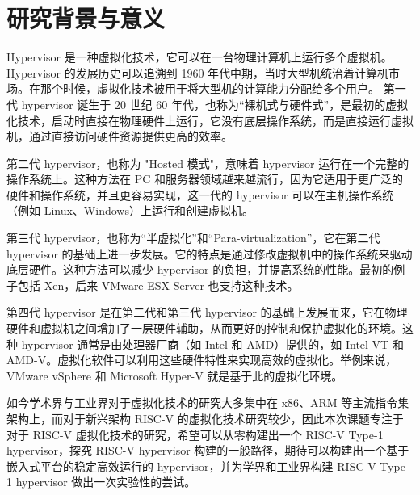 \section{研究背景与意义}
Hypervisor 是一种虚拟化技术，它可以在一台物理计算机上运行多个虚拟机。Hypervisor 的发展历史可以追溯到 1960 年代中期，当时大型机统治着计算机市场。在那个时候，虚拟化技术被用于将大型机的计算能力分配给多个用户。
第一代 hypervisor 诞生于 20 世纪 60 年代，也称为“裸机式与硬件式”，是最初的虚拟化技术，启动时直接在物理硬件上运行，它没有底层操作系统，而是直接运行虚拟机，通过直接访问硬件资源提供更高的效率。

第二代 hypervisor，也称为 "Hosted 模式"，意味着 hypervisor 运行在一个完整的操作系统上。这种方法在 PC 和服务器领域越来越流行，因为它适用于更广泛的硬件和操作系统，并且更容易实现，这一代的 hypervisor 可以在主机操作系统（例如 Linux、Windows）上运行和创建虚拟机。

第三代 hypervisor，也称为“半虚拟化”和“Para-virtualization”，它在第二代 hypervisor 的基础上进一步发展。它的特点是通过修改虚拟机中的操作系统来驱动底层硬件。这种方法可以减少 hypervisor 的负担，并提高系统的性能。最初的例子包括 Xen，后来 VMware ESX Server 也支持这种技术。

第四代 hypervisor 是在第二代和第三代 hypervisor 的基础上发展而来，它在物理硬件和虚拟机之间增加了一层硬件辅助，从而更好的控制和保护虚拟化的环境。这种 hypervisor 通常是由处理器厂商（如 Intel 和 AMD）提供的，如 Intel VT 和 AMD-V。虚拟化软件可以利用这些硬件特性来实现高效的虚拟化。举例来说，VMware vSphere 和 Microsoft Hyper-V 就是基于此的虚拟化环境。

如今学术界与工业界对于虚拟化技术的研究大多集中在 x86、ARM 等主流指令集架构上，而对于新兴架构 RISC-V 的虚拟化技术研究较少，因此本次课题专注于对于 RISC-V 虚拟化技术的研究，希望可以从零构建出一个 RISC-V Type-1 hypervisor，探究 RISC-V hypervisor 构建的一般路径，期待可以构建出一个基于嵌入式平台的稳定高效运行的 hypervisor，并为学界和工业界构建 RISC-V Type-1 hypervisor 做出一次实验性的尝试。

